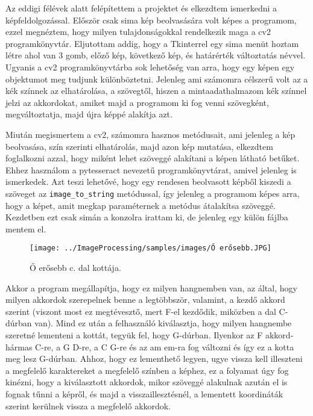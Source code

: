 
Az eddigi félévek alatt felépítettem a projektet és elkezdtem ismerkedni a képfeldolgozással. Először csak sima kép beolvasására volt képes a programom, ezzel megnéztem, hogy milyen tulajdonságokkal rendelkezik maga a cv2 programkönyvtár. Eljutottam addig, hogy a Tkinterrel egy sima menüt hoztam létre ahol van 3 gomb, előző kép, következő kép, és határérték változtatás névvel. Ugyanis a cv2 programkönyvtárba sok lehetőség van arra, hogy egy képen egy objektumot meg tudjunk különböztetni. Jelenleg ami számomra célszerű volt az a kék színnek az elhatárolása, a szövegtől, hiszen a mintaadathalmazom kék színnel jelzi az akkordokat, amiket majd a programom ki fog venni szövegként, megváltoztatja, majd újra képpé alakítja azt.

Miután megismertem a cv2, számomra hasznos metódusait, ami jelenleg a kép beolvasása, szín szerinti elhatárolás, majd azon kép mutatása, elkezdtem foglalkozni azzal, hogy miként lehet szöveggé alakítani a képen látható betűket. Ehhez használom a pytesseract nevezetű programkönyvtárat, amivel jelenleg is ismerkedek. Azt teszi lehetővé, hogy egy rendesen beolvasott képből kiszedi a szöveget az \texttt{image\_to\_string} metódussal, így jelenleg a programom képes arra, hogy a képet, amit megkap paraméternek a metódus átalakítsa szöveggé. Kezdetben ezt csak simán a konzolra irattam ki, de jelenleg egy külön fájlba mentem el.

\begin{figure}[h]
	\texttt{[image: ../ImageProcessing/samples/images/Ő erősebb.JPG]}
	\caption{Ő erősebb c. dal kottája.}
	\label{fig:Dal1}
\end{figure}

Akkor a program megállapítja, hogy ez milyen hangnemben van, az által, hogy milyen akkordok szerepelnek benne a legtöbbször, valamint, a kezdő akkord szerint (viszont most ez megtévesztő, mert F-el kezdődik, miközben a dal C-dúrban van). Mind ez után a felhasználó kiválasztja, hogy milyen hangnembe szeretné lementeni a kottát, tegyük fel, hogy G-dúrban. Ilyenkor az F akkord-hármas C-re, a G D-re, a C G-re és az am em-ra fog változni és így ez a kotta meg lesz G-dúrban. Ahhoz, hogy ez lementhető legyen, ugye vissza kell illeszteni a megfelelő karaktereket a megfelelő színben a képhez, ez a folyamat úgy fog kinézni, hogy a kiválasztott akkordok, mikor szöveggé alakulnak azután el is fognak tűnni a képről, és majd a visszaillesztésnél, a lementett koordináták szerint kerülnek vissza a megfelelő akkordok.